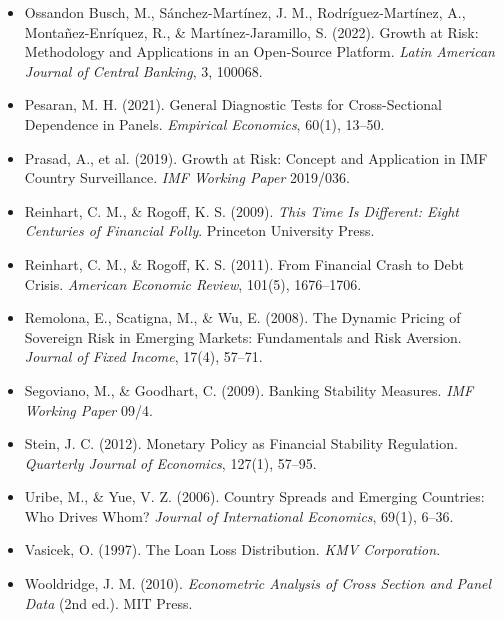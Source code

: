 \documentclass[5p,times,twocolumn,authoryear]{elsarticle}
\begin{document}
\begin{itemize}
    \item Ossandon Busch, M., Sánchez-Martínez, J. M., Rodríguez-Martínez, A., Montañez-Enríquez, R., \& Martínez-Jaramillo, S. (2022). Growth at Risk: Methodology and Applications in an Open-Source Platform. \textit{Latin American Journal of Central Banking}, 3, 100068.
    \item Pesaran, M. H. (2021). General Diagnostic Tests for Cross-Sectional Dependence in Panels. \textit{Empirical Economics}, 60(1), 13–50.
    \item Prasad, A., et al. (2019). Growth at Risk: Concept and Application in IMF Country Surveillance. \textit{IMF Working Paper} 2019/036.
    \item Reinhart, C. M., \& Rogoff, K. S. (2009). \textit{This Time Is Different: Eight Centuries of Financial Folly}. Princeton University Press.
    \item Reinhart, C. M., \& Rogoff, K. S. (2011). From Financial Crash to Debt Crisis. \textit{American Economic Review}, 101(5), 1676–1706.
    \item Remolona, E., Scatigna, M., \& Wu, E. (2008). The Dynamic Pricing of Sovereign Risk in Emerging Markets: Fundamentals and Risk Aversion. \textit{Journal of Fixed Income}, 17(4), 57–71.
    \item Segoviano, M., \& Goodhart, C. (2009). Banking Stability Measures. \textit{IMF Working Paper} 09/4.
    \item Stein, J. C. (2012). Monetary Policy as Financial Stability Regulation. \textit{Quarterly Journal of Economics}, 127(1), 57–95.
    \item Uribe, M., \& Yue, V. Z. (2006). Country Spreads and Emerging Countries: Who Drives Whom? \textit{Journal of International Economics}, 69(1), 6–36.
    \item Vasicek, O. (1997). The Loan Loss Distribution. \textit{KMV Corporation}.
    \item Wooldridge, J. M. (2010). \textit{Econometric Analysis of Cross Section and Panel Data} (2nd ed.). MIT Press.
\end{itemize}
\end{document}
